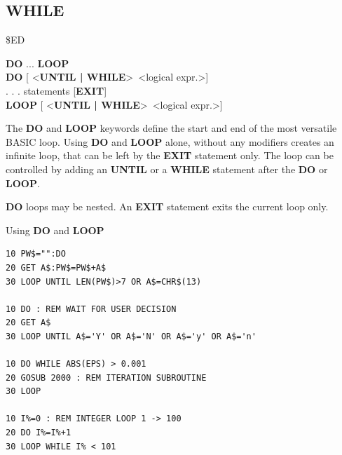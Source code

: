 \subsection{WHILE}
\begin{description}[leftmargin=2cm,style=nextline]
\item [Token:] \$ED
\item [Format:] {\bf DO} ... {\bf LOOP} \\
                {\bf DO} [ <{\bf UNTIL | WHILE}> <logical expr.>] \\
                . . . statements [{\bf EXIT}] \\
                {\bf LOOP} [ <{\bf UNTIL | WHILE}> <logical expr.>]
\item [Usage:] The {\bf DO} and {\bf LOOP} keywords define
               the start and end of the most versatile BASIC loop.
               Using {\bf DO} and {\bf LOOP} alone, without any
               modifiers creates an infinite loop, that can be left
               by the {\bf EXIT} statement only. The loop can be
               controlled by adding an {\bf UNTIL} or a {\bf WHILE}
               statement after the {\bf DO} or {\bf LOOP}.

\item [Remarks:] {\bf DO} loops may be nested. An {\bf EXIT} statement
               exits the current loop only.
\item [Example:] Using {\bf DO} and {\bf LOOP}
\begin{tcolorbox}[colback=black,coltext=white]
\verbatimfont{\codefont}
\begin{verbatim}
10 PW$="":DO
20 GET A$:PW$=PW$+A$
30 LOOP UNTIL LEN(PW$)>7 OR A$=CHR$(13)

10 DO : REM WAIT FOR USER DECISION
20 GET A$
30 LOOP UNTIL A$='Y' OR A$='N' OR A$='y' OR A$='n'

10 DO WHILE ABS(EPS) > 0.001
20 GOSUB 2000 : REM ITERATION SUBROUTINE
30 LOOP

10 I%=0 : REM INTEGER LOOP 1 -> 100
20 DO I%=I%+1
30 LOOP WHILE I% < 101
\end{verbatim}
\end{tcolorbox}
\end{description}


\newpage
